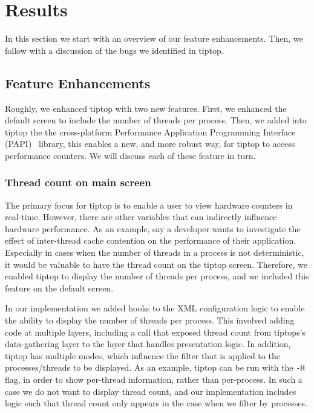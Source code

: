 \section{Results}
\label{sec:results}
In this section we start with an overview  of our feature enhancements. Then, we follow with a discussion of the bugs we identified in tiptop.

\subsection{Feature Enhancements}
Roughly, we enhanced tiptop with two new features.
First, we enhanced the default screen to include the number of threads per process.
Then, we added into tiptop the the cross-platform Performance Application Programming Interface (PAPI)~\cite{Mucci99papi:a} library, this enables a new, and more robust way, for tiptop to access performance counters.
We will discuss each of these feature in turn.

\subsubsection{Thread count on main screen}
The primary focus for tiptop is to enable a user to view hardware counters in real-time.
However, there are other variables that can indirectly influence hardware performance.
As an example, say a developer wants to investigate the effect of inter-thread cache contention on the performance of their application.
Especially in cases when the number of threads in a process is not deterministic, it would be valuable to have the thread count on the tiptop screen.
Therefore, we enabled tiptop to display the number of threads per process, and we included this feature on the default screen.

In our implementation we added hooks to the XML configuration logic to enable the ability to display the number of threads per process.
This involved adding code at multiple layers, including a call that exposed thread count from tiptops's data-gathering layer to the layer that handles presentation logic.
In addition, tiptop has multiple modes, which influence the filter that is applied to the processes/threads to be displayed.
As an example, tiptop can be run with the \texttt{-H} flag, in order to show per-thread information, rather than per-process.
In such a case we do not want to display thread count, and our implementation includes logic such that thread count only appears in the case when we filter by processes.

